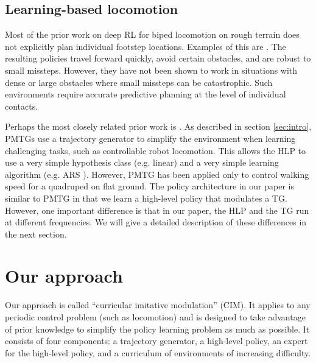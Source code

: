 \documentclass[conference]{IEEEtran}
\newcommand{\nhatch}[1]{{\leavevmode\color{magenta} Nathan: #1}}
\begin{document}
\subsection{Learning-based locomotion}

Most of the prior work on deep RL for biped locomotion on rough terrain does not explicitly plan individual footstep locations.
Examples of this are \cite{peng2018deepmimic, heess2017emergence, peng2016terrain}. The resulting policies travel forward quickly, avoid certain obstacles, and are robust to small missteps.
However, they have not been shown to work in situations with dense or large obstacles where small missteps can be catastrophic.
Such environments require accurate predictive planning at the level of individual contacts.

Perhaps the most closely related prior work is \citet{iscen2018pmtg}.
As described in section \ref{sec:intro}, PMTGs use a trajectory generator to simplify the environment when learning challenging tasks, such as controllable robot locomotion.
This allows the HLP to use a very simple hypothesis class (e.g. linear) and a very simple learning algorithm (e.g. ARS \citep{mania2018simple}).
However, PMTG has been applied only to control walking speed for a quadruped on flat ground.
The policy architecture in our paper is similar to PMTG in that we learn a high-level policy that modulates a TG.
However, one important difference is that in our paper, the HLP and the TG run at different frequencies.
We will give a detailed description of these differences in the next section.


\section{Our approach} \label{sec:approach}

Our approach is called ``curricular imitative modulation'' (CIM).
It applies to any periodic control problem (such as locomotion) and is
designed to take advantage of prior knowledge to simplify the policy learning problem as much as possible.
It consists of four components: a trajectory generator, a high-level policy, an expert for the high-level policy, and a curriculum of environments of increasing difficulty.

\end{document}
